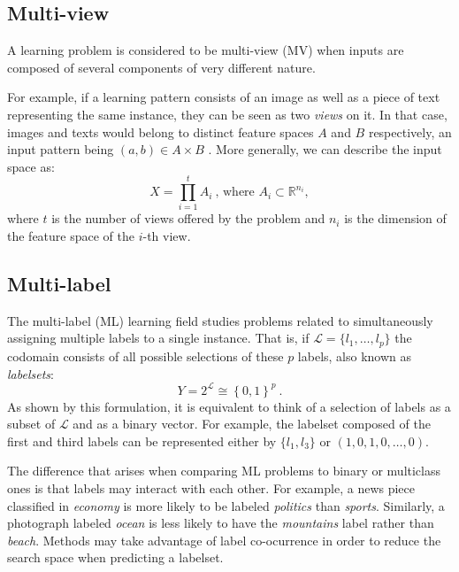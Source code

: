 \subsection{Multi-view}
\label{p3sec:mview}

A learning problem is considered to be multi-view (MV)  when inputs are composed of several components of very different nature. 

For example, if a learning pattern consists of an image as well as a piece of text representing the same instance, they can be seen as two \emph{views} on it. In that case, images and texts would belong to distinct feature spaces $A$ and $B$ respectively, an input pattern being $(a,b)\in A\times B$ . More generally, we can describe the input space as:
\begin{equation}
  X=\prod_{i=1}^{t}A_{i}~\mbox{, where }A_i\subset\mathbb R^{n_i},
  \end{equation}
where $t$ is the number of views offered by the problem and $n_i$ is the dimension of the feature space of the $i$-th view.

\subsection{Multi-label}
\label{p3sec:mlabel}

The multi-label (ML) learning field  studies problems related to simultaneously assigning multiple labels to a single instance. That is, if $\mathcal L = \{l_1,\dots,l_p\}$ the codomain consists of all possible selections of these $p$ labels, also known as \emph{labelsets}:
\begin{equation}
  Y=2^{\mathcal L}\cong\left\{0,1\right\}^p~.
  \end{equation} 
As shown by this formulation, it is equivalent to think of a selection of labels as a subset of $\mathcal L$ and as a binary vector. For example, the labelset composed of the first and third labels can be represented either by $\{l_1,l_3\}$ or $(1,0,1,0,\dots,0)$.


The difference that arises when comparing ML problems to binary or multiclass ones is that labels may interact with each other. For example, a news piece classified in \emph{economy} is more likely to be labeled \emph{politics} than \emph{sports}. Similarly, a photograph labeled \emph{ocean} is less likely to have the \emph{mountains} label rather than \emph{beach}. Methods may take advantage of label co-ocurrence  in order to reduce the search space when predicting a labelset. 


